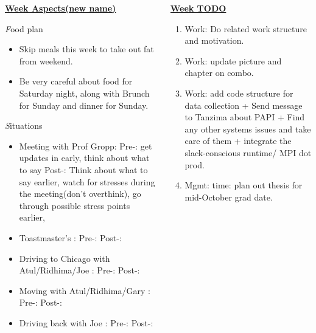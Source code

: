 \documentclass[serif,mathserif,final]{beamer}
\begin{document}
\begin{frame}{}
\begin{columns}[t]
\begin{column}{0.30\linewidth} {\textbf{\underline{Week Aspects(new name)}}}
  \begin{block}{\textit Food plan } 
    \begin{itemize} 
      \small \item \tiny Skip meals this week to take out fat from weekend. 
    \item \tiny Be very careful about food for Saturday night, along with Brunch for Sunday and dinner for Sunday. 
    \end{itemize} 
  \end{block} 

  \begin{block}{\textit Situations} 
    \begin{itemize} 
    \item \tiny Meeting with Prof Gropp: Pre-: get updates in early, think about what to say Post-:  Think about what to say earlier, watch for stresses during the meeting(don't overthink), go through possible stress points earlier, 
      
    \item \tiny Toastmaster's : Pre-:    Post-: 

    \item \tiny Driving to Chicago with Atul/Ridhima/Joe : Pre-:  Post-: 
    \item \tiny Moving with Atul/Ridhima/Gary : Pre-:      Post-: 
    \item \tiny Driving back with Joe : Pre-:      Post-: 

    \end{itemize} 
  \end{block} 

\end{column} %

\begin{column}{0.33\linewidth}{\textbf{\underline{Week TODO}}} 


\begin{block}


\begin{enumerate}

\item \tiny Work: Do related work structure and motivation. 
\item \tiny Work: update picture and chapter on combo. 
\item \tiny Work: add code structure for data collection + Send
  message to Tanzima about PAPI + Find any other systems issues and
  take care of them + integrate the slack-conscious runtime/ MPI dot
  prod. 
\item \tiny Mgmt: time: plan out thesis for mid-October grad date. 


\end{enumerate}
\end{block}
\end{column}
\end{columns}
\end{frame}
\end{document}
